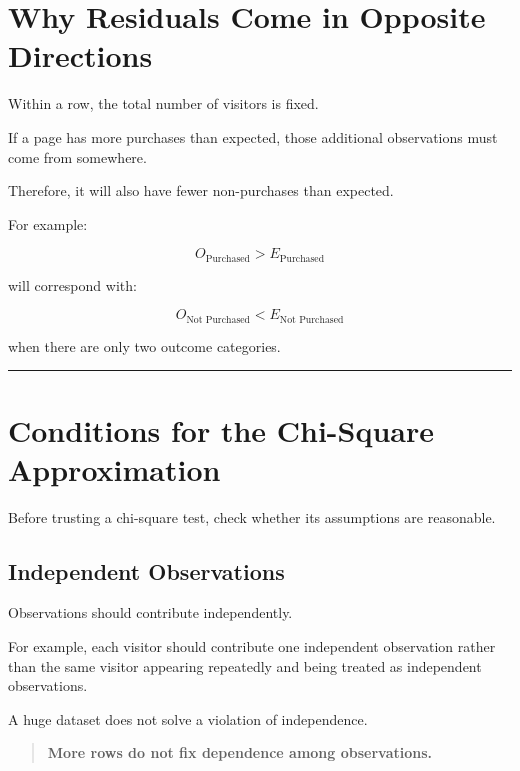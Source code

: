 \documentclass[
  letterpaper,
  DIV=11,
  numbers=noendperiod]{scrreprt}
\begin{document}

\chapter{Why Residuals Come in Opposite
Directions}\label{why-residuals-come-in-opposite-directions}

Within a row, the total number of visitors is fixed.

If a page has more purchases than expected, those additional
observations must come from somewhere.

Therefore, it will also have fewer non-purchases than expected.

For example:

\[
O_{\text{Purchased}}
>
E_{\text{Purchased}}
\]

will correspond with:

\[
O_{\text{Not Purchased}}
<
E_{\text{Not Purchased}}
\]

when there are only two outcome categories.

\begin{center}\rule{0.5\linewidth}{0.5pt}\end{center}


\chapter{Conditions for the Chi-Square
Approximation}\label{conditions-for-the-chi-square-approximation}

Before trusting a chi-square test, check whether its assumptions are
reasonable.

\section{Independent Observations}\label{independent-observations}

Observations should contribute independently.

For example, each visitor should contribute one independent observation
rather than the same visitor appearing repeatedly and being treated as
independent observations.

A huge dataset does not solve a violation of independence.

\begin{quote}
\textbf{More rows do not fix dependence among observations.}
\end{quote}
\end{document}
